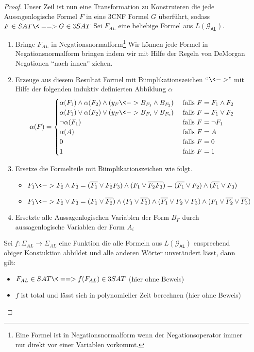 \begin{proof}
Unser Zeil ist nun eine Transformation zu Konstruieren die jede Aussagenlogische Formel $F$ in eine 3CNF Formel $G$ überführt, sodass $F\in SAT \<==> G\in 3SAT$
Sei $F_{AL}$ eine beliebige Formel aus $L(\mathcal{G}_\mathsf{AL})$.

\begin{enumerate}
 \item Bringe $F_{AL}$ in Negationsnormalform\footnote{Eine Formel ist in Negationsnormalform wenn der Negationsoperator immer nur direkt vor einer Variablen vorkommt.}
 Wir können jede Formel in Negationsnormalform bringen indem wir mit Hilfe der Regeln von DeMorgan Negationen ``nach innen'' ziehen.
 
 \item Erzeuge aus diesem Resultat Formel mit Biimplikationszeichen ``$\<->$'' mit Hilfe der folgenden induktiv definierten Abbildung $\alpha$
 $$\alpha(F)=
 \begin{cases}
   \alpha(F_1)\land\alpha(F_2)\land(y_{F}\<-> B_{F_1} \land B_{F_2}) & \text{ falls } F=F_1\land F_2\\
   \alpha(F_1)\lor\alpha(F_2)\lor(y_{F}\<-> B_{F_1} \lor B_{F_2}) & \text{ falls } F=F_1\lor F_2\\
   \neg\alpha(F_1) & \text{ falls } F=\neg F_1\\
   \alpha(A) & \text{ falls } F=A\\
   0 & \text{ falls } F=0\\
   1 & \text{ falls } F=1
  \end{cases}$$
\item Ersetze die Formelteile mit Biimplikationszeichen wie folgt.
	\begin{itemize}
	\item $F_1\<-> F_2\land F_3
		= (\overline{F_1}\lor F_2F_3)
		\land (F_1\lor \overline{F_2F_3})
		= (\overline{F_1}\lor F_2)
		\land (\overline{F_1}\lor F_3)$
	\item $F_1\<-> F_2\lor F_3
		= (F_1\lor \overline{F_2})
		\land (F_1\lor\overline{F_3})
		\land (\overline{F_1}\lor F_2\lor F_3)
		\land (F_1 \lor \overline{F_2} \lor \overline{F_3})$
	\end{itemize}
\item Ersetzte alle Aussagenlogischen Variablen der Form $B_F$ durch aussagenlogische Variablen der Form $A_i$
\end{enumerate}

Sei $f:\Sigma_{AL}\rightarrow\Sigma_{AL}$ eine Funktion die alle Formeln aus $L(\mathcal{G}_\mathsf{AL})$ ensprechend obiger Konstuktion abbildet und alle anderen Wörter unverändert lässt, dann gilt:
\begin{itemize}
 \item $F_{AL}\in SAT \<==> f(F_{AL})\in 3SAT$ (hier ohne Beweis)
 \item $f$ ist total und lässt sich in polynomieller Zeit berechnen (hier ohne Beweis)
\end{itemize}



\end{proof}

